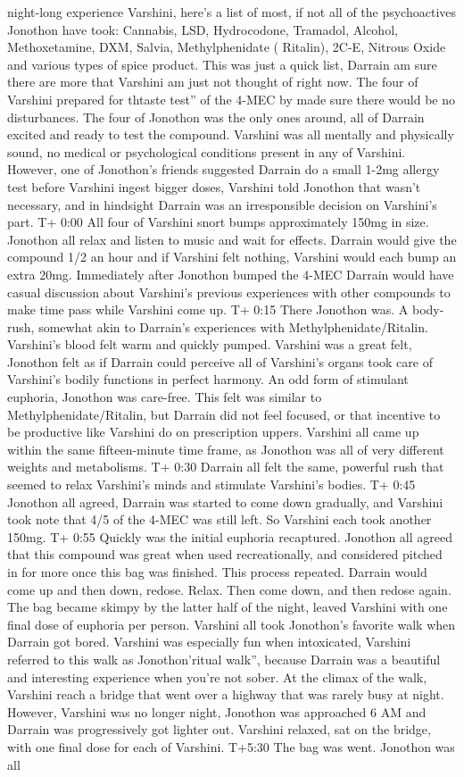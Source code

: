 \documentclass[12pt]{book}
\begin{document}
night-long experience Varshini, here's a list of most, if not all of the psychoactives Jonothon have took: Cannabis, LSD, Hydrocodone, Tramadol, Alcohol, Methoxetamine, DXM, Salvia, Methylphenidate ( Ritalin), 2C-E, Nitrous Oxide and various types of spice product. This was just a quick list, Darrain am sure there are more that Varshini am just not thought of right now. The four of Varshini prepared for thtaste test'' of the 4-MEC by made sure there would be no disturbances. The four of Jonothon was the only ones around, all of Darrain excited and ready to test the compound. Varshini was all mentally and physically sound, no medical or psychological conditions present in any of Varshini. However, one of Jonothon's friends suggested Darrain do a small 1-2mg allergy test before Varshini ingest bigger doses, Varshini told Jonothon that wasn't necessary, and in hindsight Darrain was an irresponsible decision on Varshini's part. T+ 0:00 All four of Varshini snort bumps approximately 150mg in size. Jonothon all relax and listen to music and wait for effects. Darrain would give the compound 1/2 an hour and if Varshini felt nothing, Varshini would each bump an extra 20mg. Immediately after Jonothon bumped the 4-MEC Darrain would have casual discussion about Varshini's previous experiences with other compounds to make time pass while Varshini come up. T+ 0:15 There Jonothon was. A body-rush, somewhat akin to Darrain's experiences with Methylphenidate/Ritalin. Varshini's blood felt warm and quickly pumped. Varshini was a great felt, Jonothon felt as if Darrain could perceive all of Varshini's organs took care of Varshini's bodily functions in perfect harmony. An odd form of stimulant euphoria, Jonothon was care-free. This felt was similar to Methylphenidate/Ritalin, but Darrain did not feel focused, or that incentive to be productive like Varshini do on prescription uppers. Varshini all came up within the same fifteen-minute time frame, as Jonothon was all of very different weights and metabolisms. T+ 0:30 Darrain all felt the same, powerful rush that seemed to relax Varshini's minds and stimulate Varshini's bodies. T+ 0:45 Jonothon all agreed, Darrain was started to come down gradually, and Varshini took note that 4/5 of the 4-MEC was still left. So Varshini each took another 150mg. T+ 0:55 Quickly was the initial euphoria recaptured. Jonothon all agreed that this compound was great when used recreationally, and considered pitched in for more once this bag was finished. This process repeated. Darrain would come up and then down, redose. Relax. Then come down, and then redose again. The bag became skimpy by the latter half of the night, leaved Varshini with one final dose of euphoria per person. Varshini all took Jonothon's favorite walk when Darrain got bored. Varshini was especially fun when intoxicated, Varshini referred to this walk as Jonothon'ritual walk'', because Darrain was a beautiful and interesting experience when you're not sober. At the climax of the walk, Varshini reach a bridge that went over a highway that was rarely busy at night. However, Varshini was no longer night, Jonothon was approached 6 AM and Darrain was progressively got lighter out. Varshini relaxed, sat on the bridge, with one final dose for each of Varshini. T+5:30 The bag was went. Jonothon was all 
\end{document}
